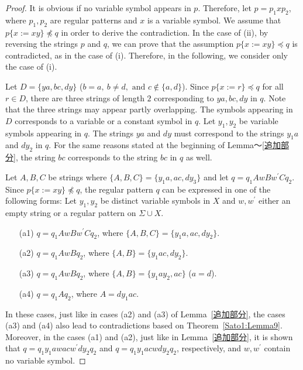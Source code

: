 \begin{proof}
  It is obvious if no variable symbol appears in $p$.
  Therefore, let $p=p_{1}xp_{2}$, where $p_{1}, p_{2}$ are regular patterns and $x$ is a variable symbol. We assume that $p \{ x := xy \} \not \preceq q$ in order to derive the contradiction.
  In the case of \textrm{(ii)}, by reversing the strings $p$ and $q$, we can prove that the assumption $p \{ x := xy \} \preceq q$ is contradicted, as in the case of \textrm{(i)}.
  Therefore, in the following, we consider only the case of \textrm{(i)}.

Let $D=\{ ya, bc, dy \}$ ($b = a,~b \not= d,\mbox{~and~}c \not\in \{a,d\}$).
Since $p \{ x := r \} \preceq q$ for all $r \in D$, there are three strings of length $2$ corresponding to $ya, bc, dy$ in $q$. Note that the three strings may appear partly overlapping.
The symbols appearing in $D$ corresponds to a variable or a constant symbol in $q$.
Let $y_{1}, y_{2}$ be variable symbols appearing in $q$.
The strings $ya$ and $dy$ must correspond to the strings $y_{1}a$ and $dy_{2}$ in $q$.
For the same reasons stated at the beginning of Lemma〜\ref{追加部分}, the string $bc$ corresponds to the string $bc$ in $q$ as well.

Let $A,B,C$ be strings where $\{ A,B,C \} = \{ y_{1}a,ac,dy_{3} \}$ and let $q=q_{1}AwBw^{\prime}Cq_{2}$.
Since $p \{ x := xy \} \not \preceq q$, the regular pattern $q$ can be expressed in one of the following forms: Let $y_{1}, y_{2}$ be distinct variable symbols in $X$ and $w, w^{\prime}$ either an empty string or a regular pattern on $\Sigma\cup X$.
\begin{enumerate}
\item[(a1)] $q=q_{1}AwBw^{\prime}Cq_{2}$, where $\{ A,B,C \} = \{ y_{1}a,ac,dy_{2} \}$.
\item[(a2)] $q=q_{1}AwBq_{2}$, where $\{ A,B \} = \{ y_{1}ac,dy_{2} \}$.
\item[(a3)] $q=q_{1}AwBq_{2}$, where $\{ A,B \} = \{ y_{1}ay_{2},ac \}$ ($a = d$).
\item[(a4)] $q=q_{1}Aq_{2}$, where $A = dy_{1}ac$.
\end{enumerate}

In these cases, just like in cases (a2) and (a3) of Lemma~\ref{追加部分}, the cases (a3) and (a4) also lead to contradictions based on Theorem~\ref{Sato1:Lemma9}.
Moreover, in the cases (a1) and (a2), just like in Lemma~\ref{追加部分}, it is shown that $q=q_{1}y_{1}awacw^{\prime}dy_{2}q_{2}$ and $q=q_{1}y_{1}acwdy_{2}q_{2}$, respectively, and $w,w^{\prime}$ contain no variable symbol.


\end{proof}
